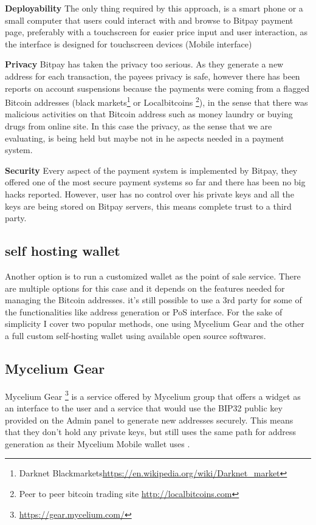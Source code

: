  \textbf{Deployability}
The only thing required by this approach, is a smart phone or a small computer that users could interact with and browse to Bitpay payment page, preferably with a touchscreen for easier price input and user interaction, as the interface is designed for touchscreen devices (Mobile interface)

 \textbf{Privacy}
Bitpay has taken the privacy too serious. As they generate a new address for each transaction, the payees privacy is safe, however there has been reports on account suspensions because the payments were coming from a flagged Bitcoin addresses (\eg black markets\footnote{Darknet Blackmarkets\url{https://en.wikipedia.org/wiki/Darknet_market}} or Localbitcoins \footnote{Peer to peer bitcoin trading site \url{http://localbitcoins.com}}), in the sense that there was malicious activities on that Bitcoin address such as money laundry or buying drugs from online site. In this case the privacy, as the sense that we are evaluating, is being held but maybe not in he aspects needed in a payment system.

 \textbf{Security}
Every aspect of the payment system is implemented by Bitpay, they offered one of the most secure payment systems so far and there has been no big hacks reported. However, user has no control over his private keys and all the keys are being stored on Bitpay servers, this means complete trust to a third party.


\subsection{self hosting wallet}
Another option is to run a customized wallet as the point of sale service. There are multiple options for this case and it depends on the features needed for managing the Bitcoin addresses. it's still possible to use a 3rd party for some of the functionalities like address generation or PoS interface. For the sake of simplicity I cover two popular methods, one using Mycelium Gear and the other a full custom self-hosting wallet using available open source softwares.


\subsection{Mycelium Gear}
Mycelium Gear \footnote{\url{https://gear.mycelium.com/}} is a service offered by Mycelium group that offers a widget as an interface to the user and a service that would use the BIP32 public key provided on the Admin panel to generate new addresses securely. This means that they don't hold any private keys, but still uses the same path for address generation as their Mycelium Mobile wallet uses .

